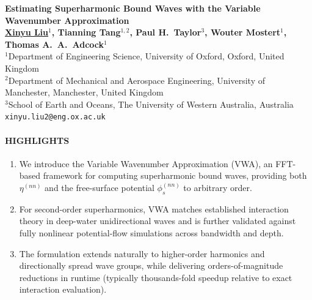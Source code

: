 \documentclass[11pt,letter]{article}
\begin{document}
\begin{center}
{\bf{\large Estimating Superharmonic Bound Waves with the Variable Wavenumber Approximation}}\\[0.25cm]

{\bf \underline{Xinyu Liu}$^{1}$, Tianning Tang$^{1,2}$, Paul H.~Taylor$^{3}$, Wouter Mostert$^{1}$, Thomas A.~A.~Adcock$^{1}$}\\[0.15cm]

$^{1}$Department of Engineering Science, University of Oxford, Oxford, United Kingdom\\
$^{2}$Department of Mechanical and Aerospace Engineering, University of Manchester, Manchester, United Kingdom\\
$^{3}$School of Earth and Oceans, The University of Western Australia, Australia\\[0.1cm]

\texttt{xinyu.liu2@eng.ox.ac.uk} 
\end{center}

\noindent

\paragraph{HIGHLIGHTS}
\begin{enumerate}[leftmargin=*, topsep=2pt, itemsep=1pt, parsep=0pt, partopsep=0pt]
    \item We introduce the Variable Wavenumber Approximation (VWA), an FFT-based framework for computing superharmonic bound waves, providing both $\eta^{(nn)}$ and the free-surface potential $\phi_s^{(nn)}$ to arbitrary order.
    \item For second-order superharmonics, VWA matches established interaction theory in deep-water unidirectional waves and is further validated against fully nonlinear potential-flow simulations across bandwidth and depth.
    \item The formulation extends naturally to higher-order harmonics and directionally spread wave groups, while delivering orders-of-magnitude reductions in runtime (typically thousands-fold speedup relative to exact interaction evaluation).
\end{enumerate}
\end{document}
